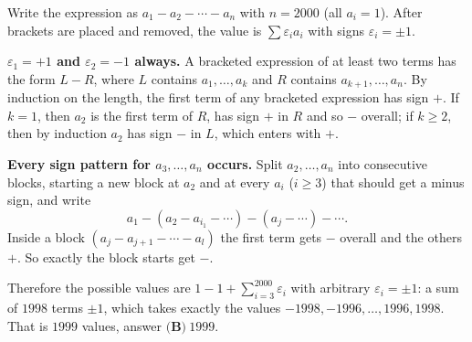 Write the expression as $a_1-a_2-\cdots-a_n$ with $n=2000$ (all $a_i=1$). After brackets are placed and removed, the value is $\sum\varepsilon_ia_i$ with signs $\varepsilon_i=\pm1$.

\textbf{$\varepsilon_1=+1$ and $\varepsilon_2=-1$ always.} A bracketed expression of at least two terms has the form $L-R$, where $L$ contains $a_1,\dots,a_k$ and $R$ contains $a_{k+1},\dots,a_n$. By induction on the length, the first term of any bracketed expression has sign $+$. If $k=1$, then $a_2$ is the first term of $R$, has sign $+$ in $R$ and so $-$ overall; if $k\ge2$, then by induction $a_2$ has sign $-$ in $L$, which enters with $+$.

\textbf{Every sign pattern for $a_3,\dots,a_n$ occurs.} Split $a_2,\dots,a_n$ into consecutive blocks, starting a new block at $a_2$ and at every $a_i$ ($i\ge3$) that should get a minus sign, and write
\[
a_1-(a_2-a_{i_1}-\cdots)-(a_j-\cdots)-\cdots .
\]
Inside a block $(a_j-a_{j+1}-\cdots-a_l)$ the first term gets $-$ overall and the others $+$. So exactly the block starts get $-$.

Therefore the possible values are $1-1+\sum_{i=3}^{2000}\varepsilon_i$ with arbitrary $\varepsilon_i=\pm1$: a sum of $1998$ terms $\pm1$, which takes exactly the values $-1998,-1996,\dots,1996,1998$. That is $1999$ values, answer $\boxed{\textbf{(B)}\ 1999}$.
